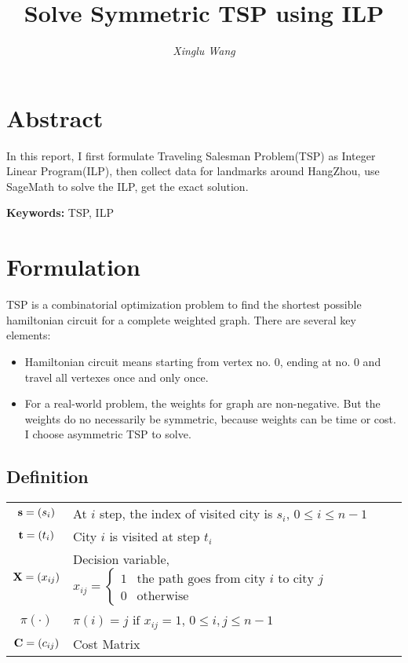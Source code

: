 \documentclass{mcmthesis}
\title{Solve Symmetric TSP using ILP}
\author{{\itshape Xinglu Wang} \quad {\itshape 3140102282} \quad {\itshape ISEE 1403, ZJU}}
\begin{document}
\maketitle
 
\setcounter{tocdepth}{2} %
\tableofcontents
		
\section*{Abstract }
In this report, I first formulate Traveling Salesman Problem(TSP) as  Integer Linear Program(ILP), then collect data for landmarks around HangZhou, use SageMath to solve the ILP, get the exact solution. 

\textbf{Keywords:} TSP, ILP
\section{Formulation}
TSP is a combinatorial optimization problem to find the shortest possible hamiltonian circuit for a complete weighted graph. There are several key elements:
\begin{itemize}
	\item Hamiltonian circuit means starting from vertex no. 0, ending at no. 0 and travel all vertexes once and only once. 
	\item For a real-world problem, the weights for graph are non-negative. But the weights do no necessarily be symmetric, because weights can be time or cost. I choose asymmetric  TSP to solve.
\end{itemize} 
\subsection{Definition}	 
\begin{center}
	\begin{tabular}{c|l}
	\hline
	$\mathbf{s} = (s_i)$ & At $i$ step, the index of visited city is $s_i$, $ 0 \le i \le n-1$\\
	$\mathbf{t}= (t_i)$ & City $i$ is visited at step $t_i$ \\ \hline \hline
	$\mathbf{X} = (x_{i j} )$ & Decision variable, $x_{ij}={\begin{cases}1&{\text{the path goes from city }}i{\text{ to city }}j\\0&{\text{otherwise}}\end{cases}}$  \\
	$\pi(\cdot )$ & $\pi(i)=j  \text{ if } x_{i j}=1$, $ 0 \le i,j \le n-1$ \\ \hline \hline
	$\mathbf{C}=(c_{ij})$ & Cost Matrix \\ 
	\hline
	\end{tabular}
\end{center}
\end{document}
